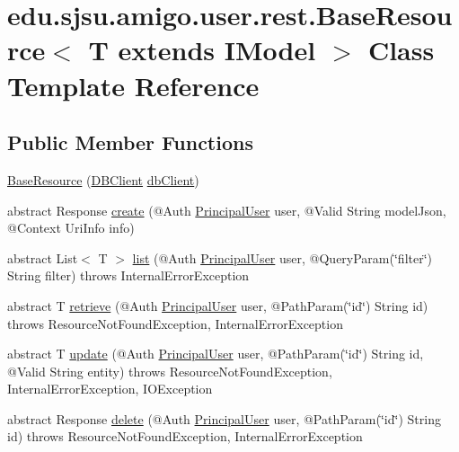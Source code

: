 \hypertarget{classedu_1_1sjsu_1_1amigo_1_1user_1_1rest_1_1_base_resource}{}\section{edu.\+sjsu.\+amigo.\+user.\+rest.\+Base\+Resource$<$ T extends I\+Model $>$ Class Template Reference}
\label{classedu_1_1sjsu_1_1amigo_1_1user_1_1rest_1_1_base_resource}
\subsection*{Public Member Functions}
\begin{DoxyCompactItemize}
\item 
\hyperlink{classedu_1_1sjsu_1_1amigo_1_1user_1_1rest_1_1_base_resource_a6584afa97ace83ded9ab4d46378c2d6a}{Base\+Resource} (\hyperlink{interfaceedu_1_1sjsu_1_1amigo_1_1db_1_1common_1_1_d_b_client}{D\+B\+Client} \hyperlink{classedu_1_1sjsu_1_1amigo_1_1user_1_1rest_1_1_base_resource_a5f2d4befed6cbdcf6f0d9f4757875db5}{db\+Client})
\item 
abstract Response \hyperlink{classedu_1_1sjsu_1_1amigo_1_1user_1_1rest_1_1_base_resource_a708bf0430236ca3a84a79784a8dcbed4}{create} (@Auth \hyperlink{classedu_1_1sjsu_1_1amigo_1_1user_1_1auth_1_1_principal_user}{Principal\+User} user, @Valid String model\+Json, @Context Uri\+Info info)
\item 
abstract List$<$ T $>$ \hyperlink{classedu_1_1sjsu_1_1amigo_1_1user_1_1rest_1_1_base_resource_a0a2b1ac87302d4791b11a52f39aa5803}{list} (@Auth \hyperlink{classedu_1_1sjsu_1_1amigo_1_1user_1_1auth_1_1_principal_user}{Principal\+User} user, @Query\+Param(\char`\"{}filter\char`\"{}) String filter)  throws Internal\+Error\+Exception
\item 
abstract T \hyperlink{classedu_1_1sjsu_1_1amigo_1_1user_1_1rest_1_1_base_resource_a5d81c201fe8aadf6b992605f64bae139}{retrieve} (@Auth \hyperlink{classedu_1_1sjsu_1_1amigo_1_1user_1_1auth_1_1_principal_user}{Principal\+User} user, @Path\+Param(\char`\"{}id\char`\"{}) String id)  throws Resource\+Not\+Found\+Exception, Internal\+Error\+Exception
\item 
abstract T \hyperlink{classedu_1_1sjsu_1_1amigo_1_1user_1_1rest_1_1_base_resource_ad690edb85a8fa9b2fd27fcc8bed2c6ff}{update} (@Auth \hyperlink{classedu_1_1sjsu_1_1amigo_1_1user_1_1auth_1_1_principal_user}{Principal\+User} user, @Path\+Param(\char`\"{}id\char`\"{}) String id, @Valid String entity)  throws Resource\+Not\+Found\+Exception, Internal\+Error\+Exception, I\+O\+Exception
\item 
abstract Response \hyperlink{classedu_1_1sjsu_1_1amigo_1_1user_1_1rest_1_1_base_resource_accf9c43ef36e1377d6082844799c0e25}{delete} (@Auth \hyperlink{classedu_1_1sjsu_1_1amigo_1_1user_1_1auth_1_1_principal_user}{Principal\+User} user, @Path\+Param(\char`\"{}id\char`\"{}) String id)  throws Resource\+Not\+Found\+Exception, Internal\+Error\+Exception
\end{DoxyCompactItemize}
